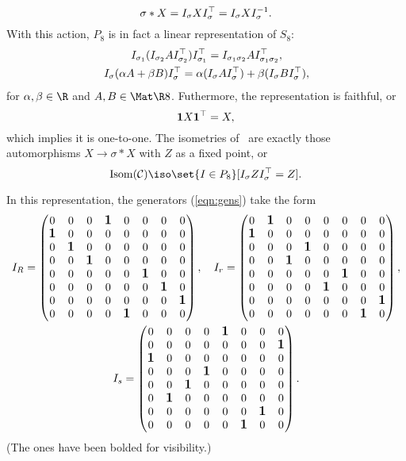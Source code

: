 \[ \sigma*X = I_\sigma X\trans{I_\sigma} = I_\sigma XI_\sigma^{-1}. \]
With this action, $P_8$ is in fact a linear representation of $S_8$:
\begin{gather*}
I_{\sigma_1}(I_{\sigma_2}A\trans{I_{\sigma_2}})\trans{I_{\sigma_1}}
= I_{\sigma_1\sigma_2}A\trans{I_{\sigma_1\sigma_2}}, \\
I_\sigma(\alpha A+\beta B)\trans{I_\sigma}
= \alpha(I_\sigma A\trans{I_\sigma}) + \beta(I_\sigma B\trans{I_\sigma}),
\end{gather*}
for $\alpha,\beta\in\R$ and $A,B\in\Mat\R8$. Futhermore, the representation is faithful, or
\begin{equation}\label{eqn:adjrep-is-faithful}
\mm 1X\trans{\mm 1} = X,
\end{equation}
which implies it is one-to-one. The isometries of \Cube\ are exactly those automorphisms $X
\to \sigma*X$ with $Z$ as a fixed point, or
\[ \IsomC \iso \set{I \in P_8}[I_\sigma Z\trans{I_\sigma} = Z]. \]

In this representation, the generators (\ref{eqn:gens}) take the form
\begin{gather*}
I_R = \begin{pmatrix}
0 & 0 & 0 & \text{\large$\mathbf{1}$} & 0 & 0 & 0 & 0 \\
\text{\large$\mathbf{1}$} & 0 & 0 & 0 & 0 & 0 & 0 & 0 \\
0 & \text{\large$\mathbf{1}$} & 0 & 0 & 0 & 0 & 0 & 0 \\
0 & 0 & \text{\large$\mathbf{1}$} & 0 & 0 & 0 & 0 & 0 \\
0 & 0 & 0 & 0 & 0 & \text{\large$\mathbf{1}$} & 0 & 0 \\
0 & 0 & 0 & 0 & 0 & 0 & \text{\large$\mathbf{1}$} & 0 \\
0 & 0 & 0 & 0 & 0 & 0 & 0 & \text{\large$\mathbf{1}$} \\
0 & 0 & 0 & 0 & \text{\large$\mathbf{1}$} & 0 & 0 & 0
\end{pmatrix},\quad
I_{r} = \begin{pmatrix}
0 & \text{\large$\mathbf{1}$} & 0 & 0 & 0 & 0 & 0 & 0 \\
\text{\large$\mathbf{1}$} & 0 & 0 & 0 & 0 & 0 & 0 & 0 \\
0 & 0 & 0 & \text{\large$\mathbf{1}$} & 0 & 0 & 0 & 0 \\
0 & 0 & \text{\large$\mathbf{1}$} & 0 & 0 & 0 & 0 & 0 \\
0 & 0 & 0 & 0 & 0 & \text{\large$\mathbf{1}$} & 0 & 0 \\
0 & 0 & 0 & 0 & \text{\large$\mathbf{1}$} & 0 & 0 & 0 \\
0 & 0 & 0 & 0 & 0 & 0 & 0 & \text{\large$\mathbf{1}$} \\
0 & 0 & 0 & 0 & 0 & 0 & \text{\large$\mathbf{1}$} & 0
\end{pmatrix}, \\
I_s = \begin{pmatrix}
0 & 0 & 0 & 0 & \text{\large$\mathbf{1}$} & 0 & 0 & 0 \\
0 & 0 & 0 & 0 & 0 & 0 & 0 & \text{\large$\mathbf{1}$} \\
\text{\large$\mathbf{1}$} & 0 & 0 & 0 & 0 & 0 & 0 & 0 \\
0 & 0 & 0 & \text{\large$\mathbf{1}$} & 0 & 0 & 0 & 0 \\
0 & 0 & \text{\large$\mathbf{1}$} & 0 & 0 & 0 & 0 & 0 \\
0 & \text{\large$\mathbf{1}$} & 0 & 0 & 0 & 0 & 0 & 0 \\
0 & 0 & 0 & 0 & 0 & 0 & \text{\large$\mathbf{1}$} & 0 \\
0 & 0 & 0 & 0 & 0 & \text{\large$\mathbf{1}$} & 0 & 0
\end{pmatrix}.
\end{gather*}
(The ones have been bolded for visibility.)
